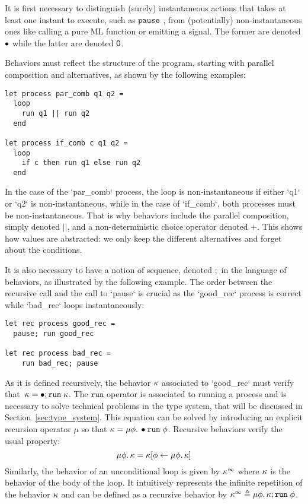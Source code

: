 \documentclass[9pt,preprint]{sigplanconf}
\newcommand{\deq}{\triangleq}
\begin{document}
It is first necessary to distinguish (surely) instantaneous actions that takes at least one instant to execute, such as $\mathtt{pause}\;{}$, from (potentially) non-instantaneous ones like calling a pure ML function or emitting a signal. The former are denoted $\bullet{}$ while the latter are denoted $\textsf{0}$.

Behaviors must reflect the structure of the program, starting with parallel composition and alternatives, as shown by the following examples: 
\begin{lstlisting}
let process par_comb q1 q2 =
  loop
    run q1 || run q2
  end

let process if_comb c q1 q2 =
  loop
    if c then run q1 else run q2
  end
\end{lstlisting}
In the case of the `par_comb` process, the loop is non-instantaneous if either `q1` or `q2` is non-instantaneous, while in the case of `if_comb`, both processes must be non-instantaneous. That is why behaviors include the parallel composition, simply denoted $||$, and a non-deterministic choice operator denoted $+$. This shows how values are abstracted: we only keep the different alternatives and forget about the conditions.

It is also necessary to have a notion of sequence, denoted $;$ in the language of behaviors, as illustrated by the following example. The order between the recursive call and the call to `pause` is crucial as the `good_rec` process is correct while `bad_rec` loops instantaneously:
\begin{lstlisting}
let rec process good_rec =
  pause; run good_rec

let rec process bad_rec =
    run bad_rec; pause
\end{lstlisting}
As it is defined recursively, the behavior  $\kappa$  associated to `good_rec` must verify that~$ \kappa = \bullet ; \mathtt{run}\; \kappa$. The $\mathtt{run}$ operator is associated to running a process and is necessary to solve technical problems in the type system, that will be discussed in Section~\ref{sec:type_system}. This equation can be solved by introducing an explicit recursion operator $\mu$ so that $\kappa = \mu \phi.\, \bullet{\mathtt{run}\; \phi}$. Recursive behaviors verify the usual property:
\[ \mu \phi.\, \kappa = \kappa[\phi \leftarrow \mu \phi.\, \kappa] \]
 Similarly, the behavior of an unconditional loop is given by $\kappa^\infty$ where $\kappa$ is the behavior of the body of the loop. It intuitively represents the infinite repetition of the behavior $\kappa$ and can be defined as a recursive behavior by $\effinf{\rk} \deq \effrec{\effvar}{\effcon{\rk}{\effrun{\effvar}}}$. 
\end{document}
